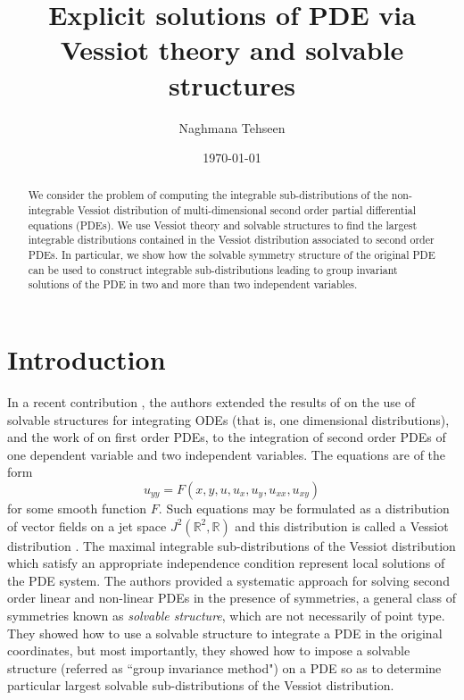 \documentclass[a4paper, 11pt]{amsart}
\theoremstyle{definition}
\begin{document}
\title{Explicit solutions of PDE via Vessiot theory and solvable structures}
\author{Naghmana Tehseen}
\address{ Department of Mathematics and Statistics, La Trobe University, Victoria, 3086, Australia}
\date{\today}
\noindent \begin{abstract}
We consider the problem of computing the integrable sub-distributions of the non-integrable Vessiot distribution of multi-dimensional second order partial differential equations (PDEs). We use Vessiot theory and solvable structures to find the largest integrable distributions contained in the Vessiot distribution associated to second order PDEs. In particular, we show how the solvable symmetry structure of the original PDE can be used to construct integrable sub-distributions leading to group invariant solutions of the PDE in two and more than two independent variables.
\end{abstract}
\maketitle
\section{Introduction}
\noindent In a recent contribution \cite{NTGP13}, the authors extended the results of \cite{sherr} on the use of solvable structures for integrating ODEs (that is, one dimensional distributions), and the work of \cite{MbarcoGP01,MBGP01} on first order PDEs, to the integration of second order PDEs of one dependent variable and two independent variables. The equations are of the form
\begin{equation*}
  u_{yy}=F(x,y,u,u_x,u_y,u_{xx},u_{xy})
\end{equation*}
for some smooth function $F.$ Such equations may be formulated \cite{Vessiot1924} as a distribution of vector fields on a jet space $J^2({\mathbb{R}}^2,{\mathbb{R}})$ and this distribution is called a Vessiot distribution \cite{Fackerell85}. The maximal integrable sub-distributions of the  Vessiot distribution which satisfy an appropriate independence condition represent local solutions of the PDE system. The authors provided a systematic approach for solving second order linear and non-linear PDEs in the presence of symmetries, a general class of symmetries known as \emph{solvable structure}, which are not necessarily of point type. They showed  how to use a solvable  structure to integrate a PDE in the original coordinates, but most importantly, they showed how to impose a solvable structure (referred as ``group invariance method") on a PDE so as to determine particular largest solvable sub-distributions of the Vessiot distribution.
\end{document}
